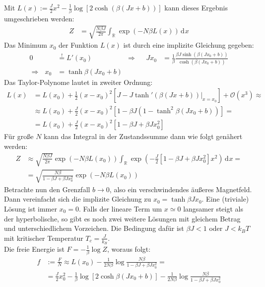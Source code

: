 \documentclass[a4paper,12pt]{article}
\newcommand{\intr}{}
\newcommand{\kla}{}
\newcommand{\klam}{}
\begin{document}
Mit $L(x):=\frac{J}{2}x^2-\frac{1}{\beta}\log\klam\left[ {2\cosh(\beta(Jx+b))} \right]$ kann dieses Ergebnis umgeschrieben werden:
\begin{align*}
Z&=\sqrt{\frac{N\beta J}{2\pi}}\intr\int_{\mathbb{R}^{ }}{\exp\kla\left( {-N\beta L(x)} \right)}\,\mathrm{d}^{ }x
\end{align*}
Das Minimum $x_0$ der Funktion $L(x)$ ist durch eine implizite Gleichung gegeben:
\begin{align*}
0&\overset{!}{=}L'(x_0)&\Rightarrow &&Jx_0&=\frac{1}{\beta}\frac{\beta J\sinh(\beta(Jx_0+b))}{\cosh(\beta(Jx_0+b))}\\
\Rightarrow\ \ \ x_0&=\tanh\beta (Jx_0+b)
\end{align*}
Das Taylor-Polynome lautet in zweiter Ordnung:
\begin{align*}
L(x)&=L(x_0)+\frac{1}{2}(x-x_0)^2\klam\left[ {J-J\tanh'(\beta(Jx+b))\big\vert_{x=x_0}} \right]+\mathcal{O}(x^3)\approx\\
&\approx L(x_0)+\frac{J}{2}(x-x_0)^2\klam\left[ {1-\beta J\kla\left( {1-\tanh^2\beta(Jx_0+b)} \right)} \right]=\\
&=L(x_0)+\frac{J}{2}(x-x_0)^2\klam\left[ {1-\beta J+\beta J x_0^2} \right]
\end{align*}
Für große $N$ kann das Integral in der Zustandssumme dann wie folgt genähert werden:
\begin{align*}
Z&\approx\sqrt{\frac{N\beta J}{2\pi}}\exp\kla\left( {-N\beta L(x_0)} \right)\intr\int_{\mathbb{R}^{ }}{\exp\kla\left( {-\frac{J}{2}\klam\left[ {1-\beta J+\beta Jx_0^2} \right]x^2} \right)}\,\mathrm{d}^{ }x=\\
&=\sqrt{\frac{N\beta}{1-\beta J+\beta Jx_0^2}}\exp\kla\left( {-N\beta L(x_0)} \right)
\end{align*}
Betrachte nun den Grenzfall $b\rightarrow 0$, also ein verschwindendes äußeres Magnetfeld. Dann vereinfacht sich die implizite Gleichung zu $x_0=\tanh\beta Jx_0$. Eine (triviale) Lösung ist immer $x_0=0$. Falls der lineare Term um $x\simeq 0$ langsamer steigt als der hyperbolische, so gibt es noch zwei weitere Lösungen mit gleichem Betrag und unterschiedlichem Vorzeichen. Die Bedingung dafür ist $\beta J<1$ oder $J<k_BT$ mit kritischer Temperatur $T_c=\frac{J}{k_B}$.\\
Die freie Energie ist $F=-\frac{1}{\beta}\log Z$, woraus folgt:
\begin{align*}
f&:=\frac{F}{N}\approx L(x_0)-\frac{1}{2N\beta}\log\frac{N\beta}{1-\beta J+\beta Jx_0^2}=\\
&=\frac{J}{2}x_0^2-\frac{1}{\beta}\log\klam\left[ {2\cosh\beta (Jx_0+b)} \right]-\frac{1}{2N\beta}\log\frac{N\beta}{1-\beta J+\beta Jx_0^2}
\end{align*}
\end{document}
